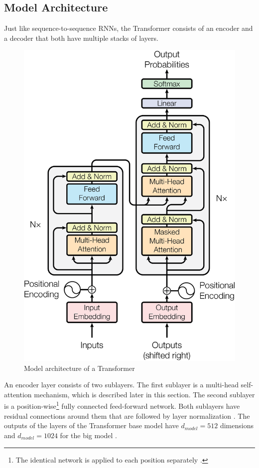 \subsection{Model Architecture}\label{ssec:transformer-model-architecture}

Just like sequence-to-sequence RNNs, the Transformer consists of an encoder and a decoder that both have multiple stacks of layers.

\begin{figure}[h]
\centering
\includegraphics{figures/transformer-model}
\caption[Model architecture of a Transformer]{Model architecture of a Transformer \cite[p.~3]{1706.03762}}
\label{fig:transformer-model}
\end{figure}

An encoder layer consists of two sublayers.
The first sublayer is a multi-head self-attention mechanism, which is described later in this section.
The second sublayer is a position-wise\footnote{The identical network is applied to each position separately \cite[p.~5]{1706.03762}.} fully connected feed-forward network.
Both sublayers have residual connections \cite{1512.03385} around them that are followed by layer normalization \cite{1607.06450}.
The outputs of the layers of the Transformer base model have $d_{model}=512$ dimensions and $d_{model}=1024$ for the big model \cite[p.~9]{1706.03762}.

